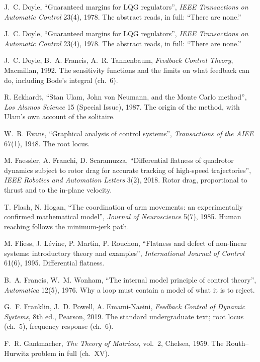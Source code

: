 \begin{description}[leftmargin=1.5em, itemindent=-1.5em, itemsep=5pt, font=\normalfont]
  \item[] J.~C. Doyle, \enquote{Guaranteed margins for LQG regulators}, \emph{IEEE Transactions on Automatic Control} 23(4), 1978. The abstract reads, in full: \enquote{There are none.}
  \item[] J.~C. Doyle, \enquote{Guaranteed margins for LQG regulators}, \emph{IEEE Transactions on Automatic Control} 23(4), 1978. The abstract reads, in full: \enquote{There are none.}
  \item[] J.~C. Doyle, B.~A. Francis, A.~R. Tannenbaum, \emph{Feedback Control Theory}, Macmillan, 1992. The sensitivity functions and the limits on what feedback can do, including Bode's integral (ch.~6).
  \item[] R. Eckhardt, \enquote{Stan Ulam, John von Neumann, and the Monte Carlo method}, \emph{Los Alamos Science} 15 (Special Issue), 1987. The origin of the method, with Ulam's own account of the solitaire.
  \item[] W.~R. Evans, \enquote{Graphical analysis of control systems}, \emph{Transactions of the AIEE} 67(1), 1948. The root locus.
  \item[] M. Faessler, A. Franchi, D. Scaramuzza, \enquote{Differential flatness of quadrotor dynamics subject to rotor drag for accurate tracking of high-speed trajectories}, \emph{IEEE Robotics and Automation Letters} 3(2), 2018. Rotor drag, proportional to thrust and to the in-plane velocity.
  \item[] T. Flash, N. Hogan, \enquote{The coordination of arm movements: an experimentally confirmed mathematical model}, \emph{Journal of Neuroscience} 5(7), 1985. Human reaching follows the minimum-jerk path.
  \item[] M. Fliess, J. Lévine, P. Martin, P. Rouchon, \enquote{Flatness and defect of non-linear systems: introductory theory and examples}, \emph{International Journal of Control} 61(6), 1995. Differential flatness.
  \item[] B.~A. Francis, W.~M. Wonham, \enquote{The internal model principle of control theory}, \emph{Automatica} 12(5), 1976. Why a loop must contain a model of what it is to reject.
  \item[] G.~F. Franklin, J.~D. Powell, A. Emami-Naeini, \emph{Feedback Control of Dynamic Systems}, 8th ed., Pearson, 2019. The standard undergraduate text; root locus (ch.~5), frequency response (ch.~6).
  \item[] F.~R. Gantmacher, \emph{The Theory of Matrices}, vol.~2, Chelsea, 1959. The Routh–Hurwitz problem in full (ch.~XV).

\end{description}
